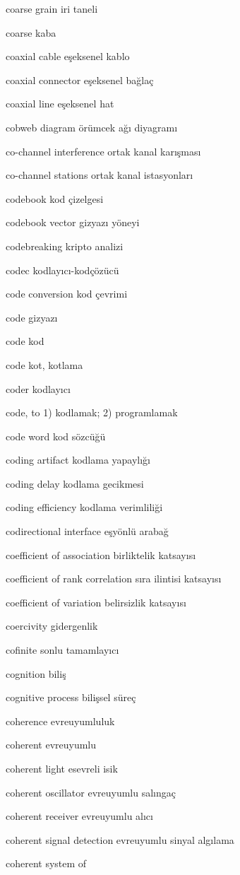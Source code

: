 \documentclass[12pt,fleqn]{article}\usepackage{../../common}
\begin{document}
coarse grain iri taneli

coarse kaba

coaxial cable eşeksenel kablo

coaxial connector eşeksenel bağlaç

coaxial line eşeksenel hat

cobweb diagram örümcek ağı diyagramı

co-channel interference ortak kanal karışması

co-channel stations ortak kanal istasyonları

codebook kod çizelgesi

codebook vector gizyazı yöneyi

codebreaking kripto analizi

codec kodlayıcı-kodçözücü

code conversion kod çevrimi

code gizyazı

code kod

code kot, kotlama

coder kodlayıcı

code, to 1) kodlamak; 2) programlamak

code word kod sözcüğü

coding artifact kodlama yapaylığı

coding delay kodlama gecikmesi

coding efficiency kodlama verimliliği

codirectional interface eşyönlü arabağ

coefficient of association birliktelik katsayısı

coefficient of rank correlation sıra ilintisi katsayısı

coefficient of variation belirsizlik katsayısı

coercivity gidergenlik

cofinite sonlu tamamlayıcı

cognition biliş

cognitive process bilişsel süreç

coherence evreuyumluluk

coherent evreuyumlu

coherent light esevreli isik

coherent oscillator evreuyumlu salıngaç

coherent receiver evreuyumlu alıcı

coherent signal detection evreuyumlu sinyal algılama

coherent system of
\end{document}
